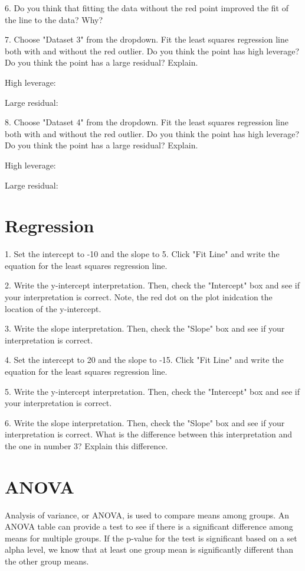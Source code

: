 \documentclass[11pt]{amsart}
\begin{document}
6. Do you think that fitting the data without the red point improved the fit of the line to the data? Why?

7. Choose "Dataset 3" from the dropdown. Fit the least squares regression line both with and without the red outlier. Do you think the point has high leverage? Do you think the point has a large residual? Explain.

High leverage:

Large residual:

8. Choose "Dataset 4" from the dropdown. Fit the least squares regression line both with and without the red outlier. Do you think the point has high leverage? Do you think the point has a large residual? Explain.

High leverage:

Large residual:


\section{Regression}
1.  Set the intercept to -10 and the slope to 5. Click "Fit Line" and write the equation for the least squares regression line.

2. Write the y-intercept interpretation. Then, check the "Intercept" box and see if your interpretation is correct. Note, the red dot on the plot inidcation the location of the y-intercept.

3. Write the slope interpretation. Then, check the "Slope" box and see if your interpretation is correct.

4.   Set the intercept to 20 and the slope to -15. Click "Fit Line" and write the equation for the least squares regression line.

5. Write the y-intercept interpretation. Then, check the "Intercept" box and see if your interpretation is correct.

6. Write the slope interpretation. Then, check the "Slope" box and see if your interpretation is correct. What is the difference between this interpretation and the one in number 3? Explain this difference.



\section{ANOVA}
Analysis of variance, or ANOVA, is used to compare means among groups.  An ANOVA table can provide a test to see if there is a significant difference among means for multiple groups. If the p-value for the test is significant based on a set alpha level, we know that at least one group mean is significantly different than the other group means.
\end{document}

